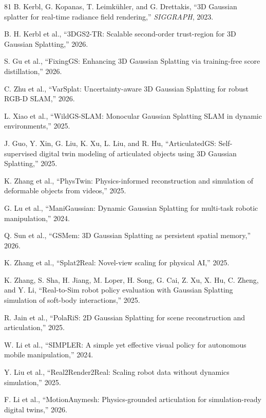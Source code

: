 \documentclass[journal]{IEEEtran}
\begin{document}
\begin{thebibliography}{81}
 B. Kerbl, G. Kopanas, T. Leimkühler, and G. Drettakis, ``3D Gaussian splatter for real-time radiance field rendering,'' \textit{SIGGRAPH}, 2023.

 B. H. Kerbl et al., ``3DGS2-TR: Scalable second-order trust-region for 3D Gaussian Splatting,'' 2026.

 S. Gu et al., ``FixingGS: Enhancing 3D Gaussian Splatting via training-free score distillation,'' 2026.

 C. Zhu et al., ``VarSplat: Uncertainty-aware 3D Gaussian Splatting for robust RGB-D SLAM,'' 2026.

 L. Xiao et al., ``WildGS-SLAM: Monocular Gaussian Splatting SLAM in dynamic environments,'' 2025.

 J. Guo, Y. Xin, G. Liu, K. Xu, L. Liu, and R. Hu, ``ArticulatedGS: Self-supervised digital twin modeling of articulated objects using 3D Gaussian Splatting,'' 2025.

 K. Zhang et al., ``PhysTwin: Physics-informed reconstruction and simulation of deformable objects from videos,'' 2025.

 G. Lu et al., ``ManiGaussian: Dynamic Gaussian Splatting for multi-task robotic manipulation,'' 2024.

 Q. Sun et al., ``GSMem: 3D Gaussian Splatting as persistent spatial memory,'' 2026.

 K. Zhang et al., ``Splat2Real: Novel-view scaling for physical AI,'' 2025.

 K. Zhang, S. Sha, H. Jiang, M. Loper, H. Song, G. Cai, Z. Xu, X. Hu, C. Zheng, and Y. Li, ``Real-to-Sim robot policy evaluation with Gaussian Splatting simulation of soft-body interactions,'' 2025.

 R. Jain et al., ``PolaRiS: 2D Gaussian Splatting for scene reconstruction and articulation,'' 2025.

 W. Li et al., ``SIMPLER: A simple yet effective visual policy for autonomous mobile manipulation,'' 2024.

 Y. Liu et al., ``Real2Render2Real: Scaling robot data without dynamics simulation,'' 2025.

 F. Li et al., ``MotionAnymesh: Physics-grounded articulation for simulation-ready digital twins,'' 2026.


\end{thebibliography}
\end{document}
